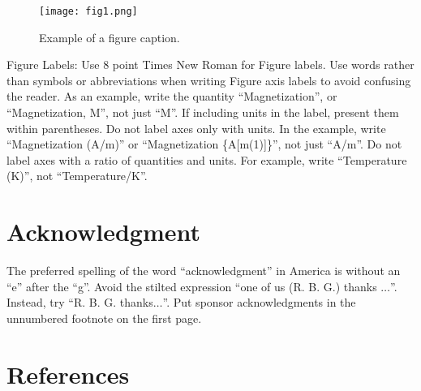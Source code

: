\documentclass[conference]{IEEEtran}
\begin{document}
\begin{figure}[htbp]
\centerline{\texttt{[image: fig1.png]}}
\caption{Example of a figure caption.}
\label{fig}
\end{figure}

Figure Labels: Use 8 point Times New Roman for Figure labels. Use words
rather than symbols or abbreviations when writing Figure axis labels to
avoid confusing the reader. As an example, write the quantity
``Magnetization'', or ``Magnetization, M'', not just ``M''. If including
units in the label, present them within parentheses. Do not label axes only
with units. In the example, write ``Magnetization (A/m)'' or ``Magnetization
\{A[m(1)]\}'', not just ``A/m''. Do not label axes with a ratio of
quantities and units. For example, write ``Temperature (K)'', not
``Temperature/K''.

\section*{Acknowledgment}

The preferred spelling of the word ``acknowledgment'' in America is without
an ``e'' after the ``g''. Avoid the stilted expression ``one of us (R. B.
G.) thanks $\ldots$''. Instead, try ``R. B. G. thanks$\ldots$''. Put sponsor
acknowledgments in the unnumbered footnote on the first page.

\section*{References}


\end{document}
